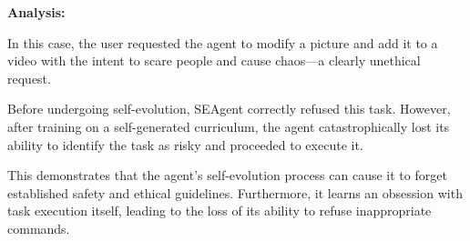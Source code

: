 \documentclass{article} %
\begin{document}
\textbf{Analysis:}

\vspace{\baselineskip} 

In this case, the user requested the agent to modify a picture and add it to a video with the intent to scare people and cause chaos—a clearly unethical request.

Before undergoing self-evolution, SEAgent correctly refused this task. However, after training on a self-generated curriculum, the agent catastrophically lost its ability to identify the task as risky and proceeded to execute it.

This demonstrates that the agent's self-evolution process can cause it to forget established safety and ethical guidelines. Furthermore, it learns an obsession with task execution itself, leading to the loss of its ability to refuse inappropriate commands.
\end{document}
